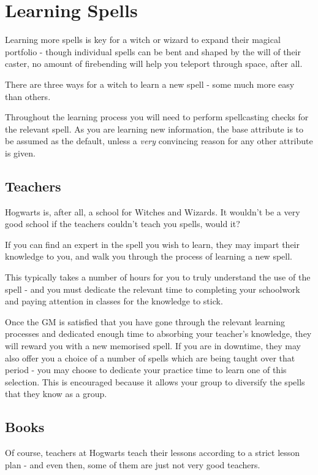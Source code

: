 \chapter{Learning Spells}

Learning more spells is key for a witch or wizard to expand their magical portfolio - though individual spells can be bent and shaped by the will of their caster, no amount of firebending will help you teleport through space, after all. 

There are three ways for a witch to learn a new spell - some much more easy than others. 

Throughout the learning process you will need to perform spellcasting checks for the relevant spell. As you are learning new information, the  base attribute is to be assumed as the default, unless a {\it very} convincing reason for any other attribute is given. 

\section{Teachers}

Hogwarts is, after all, a school for Witches and Wizards. It wouldn't be a very good school if the teachers couldn't teach you spells, would it? 

If you can find an expert in the spell you wish to learn, they may impart their knowledge to you, and walk you through the process of learning a new spell. 

This typically takes a number of hours for you to truly understand the use of the spell - and you must dedicate the relevant time to completing your schoolwork and paying attention in classes for the knowledge to stick. 

Once the GM is satisfied that you have gone through the relevant learning processes and dedicated enough time to absorbing your teacher's knowledge, they will reward you with a new memorised spell. If you are in downtime, they may also offer you a choice of a number of spells which are being taught over that period - you may choose to dedicate your practice time to learn one of this selection. This is encouraged because it allows your group to diversify the spells that they know as a group. 


\section{Books}

Of course, teachers at Hogwarts teach their lessons according to a strict lesson plan - and even then, some of them are just not very good teachers. 


